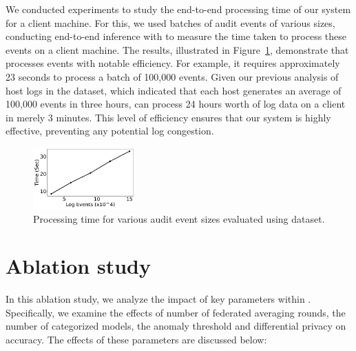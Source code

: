  We conducted experiments to study the end-to-end processing time of our system for a client machine. For this, we used batches of audit events of various sizes, conducting end-to-end inference with \Sys to measure the time taken to process these events on a client machine. The results, illustrated in Figure~\ref{sizevstime}, demonstrate that \Sys processes events with notable efficiency. For example, it requires approximately 23 seconds to process a batch of 100,000 events. Given our previous analysis of host logs in the \optc dataset, which indicated that each host generates an average of 100,000 events in three hours, \Sys can process 24 hours worth of log data on a client in merely 3 minutes. This level of efficiency ensures that our system is highly effective, preventing any potential log congestion.

\begin{figure}[!h]
  \centering
  \includegraphics[width=0.35\textwidth]{fig/sizevstime.pdf}
  \caption{Processing time for various audit event sizes evaluated using \optc dataset. }
  \label{sizevstime}
  \vspace{-2ex}
 \end{figure}


\section{Ablation study}
\label{app:ablation}

In this ablation study, we analyze the impact of key parameters within \Sys. Specifically, we examine the effects of number of federated averaging rounds, the number of \gnnshort categorized models, the anomaly threshold and differential privacy on accuracy. The effects of these parameters are discussed below:


